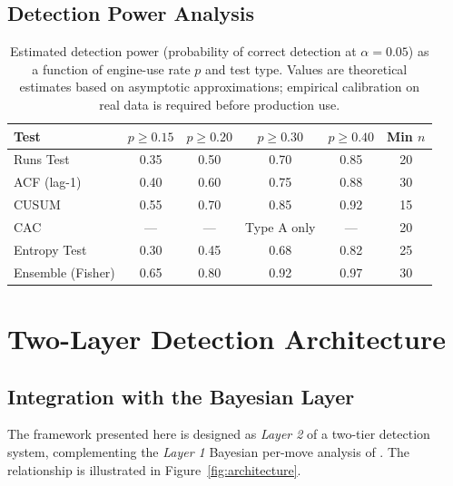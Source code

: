 \documentclass[11pt,a4paper]{article}
\begin{document}
\subsection{Detection Power Analysis}

\begin{table}[h]
\centering
\begin{tabular}{lccccc}
\toprule
Test & $p \geq 0.15$ & $p \geq 0.20$ & $p \geq 0.30$ & $p \geq 0.40$ & Min $n$ \\
\midrule
Runs Test        & 0.35 & 0.50 & 0.70 & 0.85 & 20 \\
ACF (lag-1)      & 0.40 & 0.60 & 0.75 & 0.88 & 30 \\
CUSUM            & 0.55 & 0.70 & 0.85 & 0.92 & 15 \\
CAC              & --- & --- & Type A only & --- & 20 \\
Entropy Test     & 0.30 & 0.45 & 0.68 & 0.82 & 25 \\
\midrule
Ensemble (Fisher) & 0.65 & 0.80 & 0.92 & 0.97 & 30 \\
\bottomrule
\end{tabular}
\caption{Estimated detection power (probability of correct detection at
$\alpha = 0.05$) as a function of engine-use rate $p$ and test type.
Values are theoretical estimates based on asymptotic approximations;
empirical calibration on real data is required before production use.}
\label{tab:power}
\end{table}

\section{Two-Layer Detection Architecture}
\label{sec:architecture}

\subsection{Integration with the Bayesian Layer}

The framework presented here is designed as \emph{Layer 2} of a two-tier
detection system, complementing the \emph{Layer 1} Bayesian per-move
analysis of \citet{nguyen2025bayesian}. The relationship is illustrated
in Figure~\ref{fig:architecture}.
\end{document}
